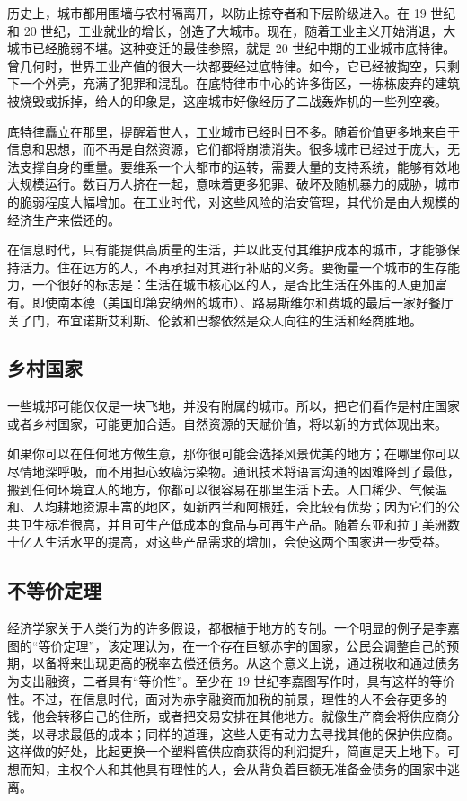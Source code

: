 历史上，城市都用围墙与农村隔离开，以防止掠夺者和下层阶级进入。在 19 世纪和 20 世纪，工业就业的增长，创造了大城市。现在，随着工业主义开始消退，大城市已经脆弱不堪。这种变迁的最佳参照，就是 20 世纪中期的工业城市底特律。曾几何时，世界工业产值的很大一块都要经过底特律。如今，它已经被掏空，只剩下一个外壳，充满了犯罪和混乱。在底特律市中心的许多街区，一栋栋废弃的建筑被烧毁或拆掉，给人的印象是，这座城市好像经历了二战轰炸机的一些列空袭。

底特律矗立在那里，提醒着世人，工业城市已经时日不多。随着价值更多地来自于信息和思想，而不再是自然资源，它们都将崩溃消失。很多城市已经过于庞大，无法支撑自身的重量。要维系一个大都市的运转，需要大量的支持系统，能够有效地大规模运行。数百万人挤在一起，意味着更多犯罪、破坏及随机暴力的威胁，城市的脆弱程度大幅增加。在工业时代，对这些风险的治安管理，其代价是由大规模的经济生产来偿还的。

在信息时代，只有能提供高质量的生活，并以此支付其维护成本的城市，才能够保持活力。住在远方的人，不再承担对其进行补贴的义务。要衡量一个城市的生存能力，一个很好的标志是：生活在城市核心区的人，是否比生活在外围的人更加富有。即使南本德（美国印第安纳州的城市）、路易斯维尔和费城的最后一家好餐厅关了门，布宜诺斯艾利斯、伦敦和巴黎依然是众人向往的生活和经商胜地。

\subsection{乡村国家}
一些城邦可能仅仅是一块飞地，并没有附属的城市。所以，把它们看作是村庄国家或者乡村国家，可能更加合适。自然资源的天赋价值，将以新的方式体现出来。

如果你可以在任何地方做生意，那你很可能会选择风景优美的地方；在哪里你可以尽情地深呼吸，而不用担心致癌污染物。通讯技术将语言沟通的困难降到了最低，搬到任何环境宜人的地方，你都可以很容易在那里生活下去。人口稀少、气候温和、人均耕地资源丰富的地区，如新西兰和阿根廷，会比较有优势；因为它们的公共卫生标准很高，并且可生产低成本的食品与可再生产品。随着东亚和拉丁美洲数十亿人生活水平的提高，对这些产品需求的增加，会使这两个国家进一步受益。

\subsection{不等价定理}
经济学家关于人类行为的许多假设，都根植于地方的专制。一个明显的例子是李嘉图的“等价定理”，该定理认为，在一个存在巨额赤字的国家，公民会调整自己的预期，以备将来出现更高的税率去偿还债务。从这个意义上说，通过税收和通过债务为支出融资，二者具有“等价性”。至少在 19 世纪李嘉图写作时，具有这样的等价性。不过，在信息时代，面对为赤字融资而加税的前景，理性的人不会存更多的钱，他会转移自己的住所，或者把交易安排在其他地方。就像生产商会将供应商分类，以寻求最低的成本；同样的道理，这些人更有动力去寻找其他的保护供应商。这样做的好处，比起更换一个塑料管供应商获得的利润提升，简直是天上地下。可想而知，主权个人和其他具有理性的人，会从背负着巨额无准备金债务的国家中逃离。

